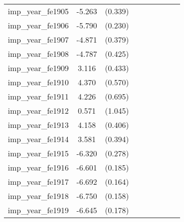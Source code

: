 {\begin{tabular}{l*{4}{cc}}
imp\_year\_fe1905&   -5.263\sym{***}&  (0.339)&                  &         &                  &         &                  &         \\
imp\_year\_fe1906&   -5.790\sym{***}&  (0.230)&                  &         &                  &         &                  &         \\
imp\_year\_fe1907&   -4.871\sym{***}&  (0.379)&                  &         &                  &         &                  &         \\
imp\_year\_fe1908&   -4.787\sym{***}&  (0.425)&                  &         &                  &         &                  &         \\
imp\_year\_fe1909&    3.116\sym{***}&  (0.433)&                  &         &                  &         &                  &         \\
imp\_year\_fe1910&    4.370\sym{***}&  (0.570)&                  &         &                  &         &                  &         \\
imp\_year\_fe1911&    4.226\sym{***}&  (0.695)&                  &         &                  &         &                  &         \\
imp\_year\_fe1912&    0.571         &  (1.045)&                  &         &                  &         &                  &         \\
imp\_year\_fe1913&    4.158\sym{***}&  (0.406)&                  &         &                  &         &                  &         \\
imp\_year\_fe1914&    3.581\sym{***}&  (0.394)&                  &         &                  &         &                  &         \\
imp\_year\_fe1915&   -6.320\sym{***}&  (0.278)&                  &         &                  &         &                  &         \\
imp\_year\_fe1916&   -6.601\sym{***}&  (0.185)&                  &         &                  &         &                  &         \\
imp\_year\_fe1917&   -6.692\sym{***}&  (0.164)&                  &         &                  &         &                  &         \\
imp\_year\_fe1918&   -6.750\sym{***}&  (0.158)&                  &         &                  &         &                  &         \\
imp\_year\_fe1919&   -6.645\sym{***}&  (0.178)&                  &         &                  &         &                  &         \\

\end{tabular}}
